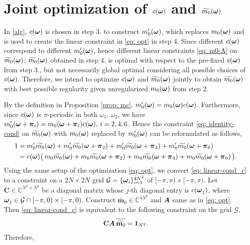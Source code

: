 \section{Joint optimization of $c(\boldsymbol{\omega})$ and $\widetilde{m_{0}}(\boldsymbol{\omega})$}\label{app: QCQP}

In \ref{alg}, $c(\boldsymbol{\omega})$ is chosen in step 3. to construct $m_0'(\boldsymbol{\omega})$, which replaces $m_0(\boldsymbol{\omega})$ and is used to create the linear constraint in \eqref{eq: opt} in step 4. Since different $c(\boldsymbol{\omega})$ correspond to different $m_0'(\boldsymbol{\omega})$, hence different linear constraints \eqref{eq: m0-A} on $\widetilde{m_{0}}(\boldsymbol{\omega})$; $\widetilde{m_{0}}(\boldsymbol{\omega})$ obtained in step 4. is optimal with respect to the pre-fixed $c(\boldsymbol{\omega})$ from step 3., but not necessarily global optimal considering all possible choices of $c(\boldsymbol{\omega})$. Therefore, we intend to optimize $c(\boldsymbol{\omega})$ and $\widetilde{m_{0}}(\boldsymbol{\omega})$ jointly to obtain $\widetilde{m_{0}}(\boldsymbol{\omega})$ with best possible regularity given unregularized $m_0(\boldsymbol{\omega})$ from step 2.

By the definition in Proposition \ref{prop: mc}, $m_0'(\boldsymbol{\omega}) = m_0(\boldsymbol{\omega})c(\boldsymbol{\omega})$. Furthermore, since $c(\boldsymbol{\omega})$ is $\pi$-periodic in both $\omega_1,\,\omega_2$, we have $m_0'(\boldsymbol{\omega}+\boldsymbol{\pi}_i) = m_0(\boldsymbol{\omega}+\boldsymbol{\pi}_i)c(\boldsymbol{\omega}),\, i = 2,4,6$. Hence the constraint \eqref{eq: identity-cond} on $\widetilde{m_{0}}(\boldsymbol{\omega})$ with $m_0(\boldsymbol{\omega})$ replaced by $m_0'(\boldsymbol{\omega})$ can be reformulated as follows,
\begin{align}
1 & = m_0'\widetilde{m_{0}}(\boldsymbol{\omega}) + m_0'\widetilde{m_{0}}(\boldsymbol{\omega}+\boldsymbol{\pi}_{2}) + m_0'\widetilde{m_{0}}(\boldsymbol{\omega}+\boldsymbol{\pi}_{4}) + m_0'\widetilde{m_{0}}(\boldsymbol{\omega}+\boldsymbol{\pi}_{6})\notag\\
& = c(\boldsymbol{\omega})\big(\,m_0\widetilde{m_{0}}(\boldsymbol{\omega}) + m_0\widetilde{m_{0}}(\boldsymbol{\omega}+\boldsymbol{\pi}_{2}) + m_0\widetilde{m_{0}}(\boldsymbol{\omega}+\boldsymbol{\pi}_{4}) + m_0\widetilde{m_{0}}(\boldsymbol{\omega}+\boldsymbol{\pi}_{6})\,\big).\label{eq: linear-cond_c}
\end{align}
Using the same setup of the optimization \eqref{eq: opt}, we convert \eqref{eq: linear-cond_c} to a constraint on a $2N\times 2N$ grid $\mathcal{G}=\{\boldsymbol{\omega}_i\}_{i=1}^{4N^2}$ of $[-\pi,\pi)\times[-\pi,\pi)$.
Let $\mathbf{C}\in\mathbb{C}^{N^2\times N^2}$ be a diagonal matrix whose $j$-th diagonal entry is $c(\boldsymbol{\omega}_j)$, where $\boldsymbol{\omega}_j\in \mathcal{G}\cap [-\pi,0)\times[-\pi,0)$. Construct $\widetilde{\mathbf{m}_0}\in\mathbb{C}^{4N^2}$ and $\boldsymbol{A}$ same as in \eqref{eq: opt}. Then \eqref{eq: linear-cond_c} is equivalent to the following constraint on the grid $\mathcal{G}$,
\begin{align}
\mathbf{C}\V{A}\,\overlinespace{\widetilde{\mathbf{m}_0}} = \V{1}_{N^2}.
\end{align}
Therefore, 